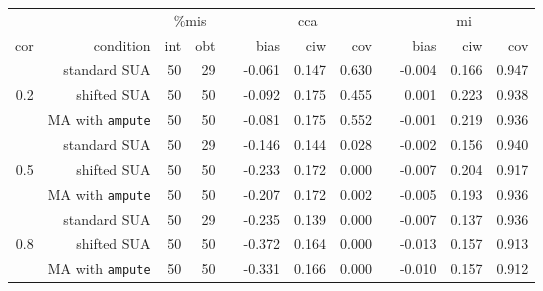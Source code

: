 \documentclass[11pt,a4paper]{article}
\newcommand{\code}[1]{\texttt{#1}}
\begin{document}
\begin{table}[h!]
\begin{subtable}{1\textwidth}
\centering
\captionsetup{justification=justified,singlelinecheck=false,width = 0.93\textwidth}
  \label{sim2a}
\begin{tabular}{rrrrrrrrrrrr}
\hline
&& \multicolumn{2}{c}{\%mis} && \multicolumn{3}{c}{cca} && \multicolumn{3}{c}{mi} \\
\cline{3-4} \cline{6-8} \cline{10-12}
cor & condition & int & obt & & bias & ciw & cov & & bias & ciw & cov \\ 
\hline
 & standard SUA & 50 & 29 &  & -0.061 & 0.147 & 0.630 &  & -0.004 & 0.166 & 0.947 \\ 
  0.2 & shifted SUA & 50 & 50 &  & -0.092 & 0.175 & 0.455 &  & 0.001 & 0.223 & 0.938 \\ 
   & MA with \code{ampute} & 50 & 50 &  & -0.081 & 0.175 & 0.552 &  & -0.001 & 0.219 & 0.936 \\ 
   \cline{2-12}
   & standard SUA & 50 & 29 &  & -0.146 & 0.144 & 0.028 &  & -0.002 & 0.156 & 0.940 \\ 
  0.5 & shifted SUA & 50 & 50 &  & -0.233 & 0.172 & 0.000 &  & -0.007 & 0.204 & 0.917 \\ 
   & MA with \code{ampute} & 50 & 50 &  & -0.207 & 0.172 & 0.002 &  & -0.005 & 0.193 & 0.936 \\ 
   \cline{2-12}
   & standard SUA & 50 & 29 &  & -0.235 & 0.139 & 0.000 &  & -0.007 & 0.137 & 0.936 \\ 
  0.8 & shifted SUA & 50 & 50 &  & -0.372 & 0.164 & 0.000 &  & -0.013 & 0.157 & 0.913 \\ 
   & MA with \code{ampute} & 50 & 50 &  & -0.331 & 0.166 & 0.000 &  & -0.010 & 0.157 & 0.912 \\ 
   \hline
\end{tabular}
\vspace{2mm}
\captionsetup{justification=justified,singlelinecheck=false,width = 0.93\textwidth}
  \end{subtable}

\end{table}
\end{document}
